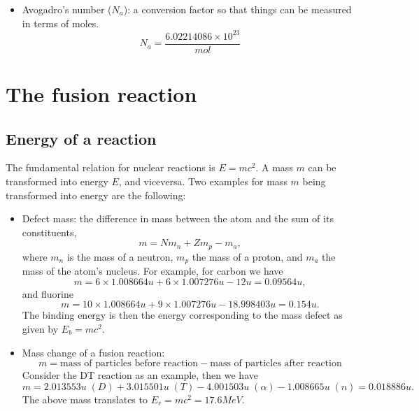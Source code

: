 \documentclass[a4paper,11pt]{report}
\begin{document}
\begin{itemize}
\item Avogadro's number ($N_a$): a conversion factor so that things can be measured in terms of moles. 
\begin{equation}
    N_a = \frac{6.02214086 \times 10^{23}}{mol} 
\end{equation}

\end{itemize}
\section{The fusion reaction}
\subsection{Energy of a reaction}
The fundamental relation for nuclear reactions is $E = m c^2$. A mass $m$ can be transformed into energy $E$, and viceversa. Two examples for mass $m$ being transformed into energy are the following:

\begin{itemize}
\item Defect mass: the difference in mass between the atom and the sum of its constituents,
\begin{equation}
m = N m_n + Z m_p - m_a,
\end{equation}
where $m_n$ is the mass of a neutron, $m_p$ the mass of a proton, and $m_a$ the mass of the atom's nucleus. For example, for carbon we have
\begin{equation}
m = 6 \times 1.008664 u + 6 \times 1.007276 u - 12u = 0.09564 u,
\end{equation}
and fluorine
\begin{equation}
m = 10 \times 1.008664 u + 9 \times 1.007276 u - 18.998403u = 0.154 u.
\end{equation}
The binding energy is then the energy corresponding to the mass defect as given by  $E_b = m c^2$.

\item Mass change of a fusion reaction:
\begin{equation}
m = \text{mass of particles before reaction} - \text{mass of particles after reaction} 
\end{equation}
Consider the DT reaction as an example, then we have
\begin{equation}
m = 2.013553u \;(D) + 3.015501u \;(T) - 4.001503u \;(\alpha) - 1.008665u \;(n) = 0.018886u.
\end{equation}
The above mass translates to $E_r = mc^2 = 17.6MeV$.
\end{itemize}
\end{document}
